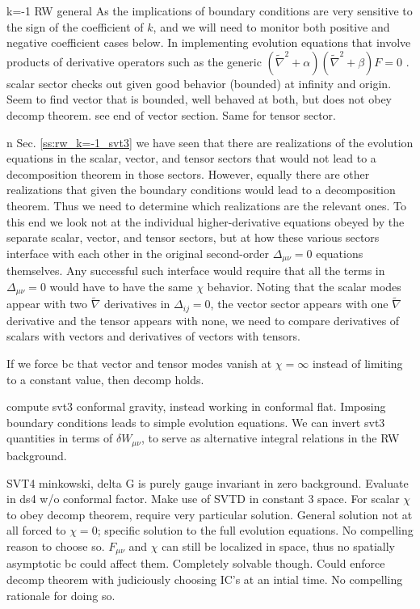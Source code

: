 k=-1 RW general As the implications of boundary conditions are very sensitive to the sign of the coefficient of $k$, and we will need to monitor both positive and negative coefficient cases below. In implementing evolution equations that involve products of derivative operators such as the generic $(\tilde{\nabla}^2+\alpha)(\tilde{\nabla}^2+\beta)F=0$ . scalar sector checks out given good behavior (bounded) at infinity and origin. Seem to find vector that is bounded, well behaved at both, but does not obey decomp theorem. see end of vector section. Same for tensor sector.

n Sec. \ref{ss:rw_k=-1_svt3} we have seen that there are realizations of the evolution equations in the scalar, vector, and tensor sectors that would not lead to a decomposition theorem in those sectors. However, equally there are other realizations that given the boundary conditions would lead to a decomposition theorem. Thus we need to determine which realizations are the relevant ones. To this end we look not at the individual higher-derivative equations obeyed by the separate scalar, vector, and tensor sectors, but at how these various sectors interface with each other in the original second-order $\Delta_{\mu\nu}=0$ equations themselves. Any successful such interface would require that all the terms in $\Delta_{\mu\nu}=0$ would have to have the same $\chi$ behavior. Noting that the scalar modes appear with two $\tilde{\nabla}$ derivatives in $\Delta_{ij}=0$, the vector sector appears with one $\tilde{\nabla}$ derivative and the tensor appears with none, we need to compare derivatives of scalars with vectors and derivatives of vectors with tensors. 

If we force bc that vector and tensor modes vanish at $\chi=\infty$ instead of limiting to a constant value, then decomp holds. 

compute svt3 conformal gravity, instead working in conformal flat. Imposing boundary conditions leads to simple evolution equations. We can invert svt3 quantities in terms of $\delta W_{\mu\nu}$, to serve as alternative integral relations in the RW background. 

SVT4 minkowski, delta G is purely gauge invariant in zero background. Evaluate in ds4 w/o conformal factor. Make use of SVTD in constant 3 space. For scalar $\chi$ to obey decomp theorem, require very particular solution. General solution not at all forced to $\chi =0$; specific solution to the full evolution equations. No compelling reason to choose so. $F_{\mu\nu}$ and $\chi$ can still be localized in space, thus no spatially asymptotic bc could affect them. Completely solvable though. Could enforce decomp theorem with judiciously choosing IC's at an intial time. No compelling rationale for doing so. 

